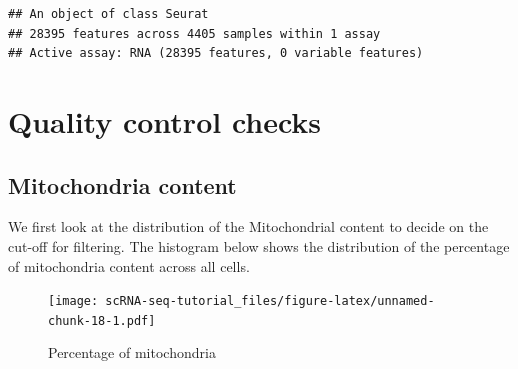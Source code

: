 \documentclass[
]{book}
\newenvironment{Shaded}{\begin{snugshade}}{\end{snugshade}}
\newcommand{\AttributeTok}[1]{\textcolor[rgb]{0.77,0.63,0.00}{#1}}
\newcommand{\DecValTok}[1]{\textcolor[rgb]{0.00,0.00,0.81}{#1}}
\newcommand{\FloatTok}[1]{\textcolor[rgb]{0.00,0.00,0.81}{#1}}
\newcommand{\FunctionTok}[1]{\textcolor[rgb]{0.00,0.00,0.00}{#1}}
\newcommand{\NormalTok}[1]{#1}
\newcommand{\OtherTok}[1]{\textcolor[rgb]{0.56,0.35,0.01}{#1}}
\newcommand{\SpecialCharTok}[1]{\textcolor[rgb]{0.00,0.00,0.00}{#1}}
\newcommand{\StringTok}[1]{\textcolor[rgb]{0.31,0.60,0.02}{#1}}
\begin{document}
\begin{verbatim}
## An object of class Seurat 
## 28395 features across 4405 samples within 1 assay 
## Active assay: RNA (28395 features, 0 variable features)
\end{verbatim}

\hypertarget{quality-control-checks}{%
\section{Quality control checks}\label{quality-control-checks}}

\hypertarget{mitochondria-content}{%
\subsection{Mitochondria content}\label{mitochondria-content}}

We first look at the distribution of the Mitochondrial content to decide on the cut-off for filtering. The histogram below shows the distribution of the percentage of mitochondria content across all cells.

\begin{Shaded}
\end{Shaded}

\begin{figure}
\centering
\texttt{[image: scRNA-seq-tutorial\_files/figure-latex/unnamed-chunk-18-1.pdf]}
\caption{\label{fig:unnamed-chunk-18}Percentage of mitochondria}
\end{figure}
\end{document}
